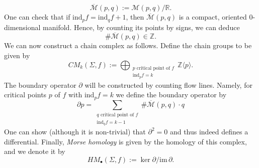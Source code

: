 \documentclass[11pt,colorinlistoftodos]{amsart}
\numberwithin{equation}{subsection}
\theoremstyle{plain}
\theoremstyle{definition}
\theoremstyle{remark}
\newcommand{\R}{\mathbb{R}}
\newcommand{\Z}{\mathbb{Z}}
\newcommand{\de}{\partial}
\newcommand{\calM}{\mathcal{M}}
\begin{document}
\[
\overline{\calM}(p,q):=\calM(p,q)/\R.
\]
One can check that if $\mathrm{ind}_pf=\mathrm{ind}_qf+1$, then $\overline{\calM}(p,q)$ is a compact, oriented 0-dimensional manifold. Hence, by counting its points by signs, we can deduce
\begin{equation}
    \#\overline{\calM}(p,q)\in \Z.
\end{equation}
We can now construct a chain complex as follows. Define the chain groups to be given by 
\begin{equation}
    CM_k(\Sigma,f):=\bigoplus_{\substack{\text{$p$ critical point of $f$}\\ \mathrm{ind}_pf=k}}\Z\langle p\rangle.
\end{equation}
The boundary operator $\de$ will be constructed by counting flow lines. Namely, for critical points $p$ of $f$ with $\mathrm{ind}_pf=k$ we define the boundary operator by 
\begin{equation}
    \de p=\sum_{\substack{\text{$q$ critical point of $f$}\\ \mathrm{ind}_qf=k-1}}\#\overline{\calM}(p,q)\cdot q
\end{equation}
One can show (although it is non-trivial) that $\de^2=0$ and thus indeed defines a differential. 
Finally, \emph{Morse homology} is given by the homology of this complex, and we denote it by 
\[
HM_\bullet(\Sigma,f):=\ker \de/\mathrm{im}\,\de.
\]
\end{document}
